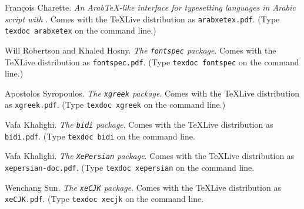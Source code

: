 \begin{thebibliography}{99}
 Fran\c{c}ois Charette.                    
    \newblock \emph{An Arab\TeX-like interface for typesetting languages
     in Arabic script with }.                                        
    \newblock Comes with the \TeX Live distribution as                                            
  \texttt{arabxetex.pdf}. (Type \texttt{texdoc arabxetex} on the command line.)

 Will Robertson and Khaled Hosny.                    
    \newblock \emph{The \texttt{fontspec} package}.                                        
    \newblock Comes with the \TeX Live distribution as                                            
  \texttt{fontspec.pdf}. (Type \texttt{texdoc fontspec} on the command line.)
    
 Apostolos Syropoulos.                    
    \newblock \emph{The \texttt{xgreek} package}.                                        
    \newblock Comes with the \TeX Live distribution as                                            
  \texttt{xgreek.pdf}. (Type \texttt{texdoc xgreek} on the command line.)

 Vafa Khalighi.                    
    \newblock \emph{The \texttt{bidi} package}.                                        
    \newblock Comes with the \TeX Live distribution as                                            
  \texttt{bidi.pdf}. (Type \texttt{texdoc bidi} on the command line.

 Vafa Khalighi.                    
    \newblock \emph{The \texttt{XePersian} package}.                                        
    \newblock Comes with the \TeX Live distribution as                                            
  \texttt{xepersian-doc.pdf}. (Type \texttt{texdoc xepersian} on the command line.

 Wenchang Sun.                    
    \newblock \emph{The \texttt{xeCJK} package}.                                        
    \newblock Comes with the \TeX Live distribution as                                            
  \texttt{xeCJK.pdf}. (Type \texttt{texdoc xecjk} on the command line.

\end{thebibliography}

